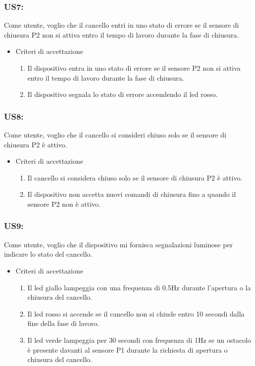 \documentclass[12pt]{article}
\begin{document}
\subsubsection{US7:}
Come utente, voglio che il cancello entri in uno stato di errore se il sensore di chiusura P2 non si attiva entro il tempo di lavoro durante la fase di chiusura.
\begin{itemize}
    \item Criteri di accettazione
    \begin{enumerate}
        \item Il dispositivo entra in uno stato di errore se il sensore P2 non si attiva entro il tempo di lavoro durante la fase di chiusura.
        \item Il dispositivo segnala lo stato di errore accendendo il led rosso.
    \end{enumerate}
\end{itemize}
\subsubsection{US8:}
Come utente, voglio che il cancello si consideri chiuso solo se il sensore di chiusura P2 è attivo.
\begin{itemize}
    \item Criteri di accettazione
    \begin{enumerate}
        \item Il cancello si considera chiuso solo se il sensore di chiusura P2 è attivo.
        \item Il dispositivo non accetta nuovi comandi di chiusura fino a quando il sensore P2 non è attivo.
    \end{enumerate}
\end{itemize}
\subsubsection{US9:}
Come utente, voglio che il dispositivo mi fornisca segnalazioni luminose per indicare lo stato del cancello.
\begin{itemize}
    \item Criteri di accettazione
    \begin{enumerate}
        \item Il led giallo lampeggia con una frequenza di 0.5Hz durante l'apertura o la chiusura del cancello.
        \item Il led rosso si accende se il cancello non si chiude entro 10 secondi dalla fine della fase di lavoro.
        \item Il led verde lampeggia per 30 secondi con frequenza di 1Hz se un ostacolo è presente davanti al sensore P1 durante la richiesta di apertura o chiusura del cancello.
    \end{enumerate}
\end{itemize}
\newpage
\end{document}
